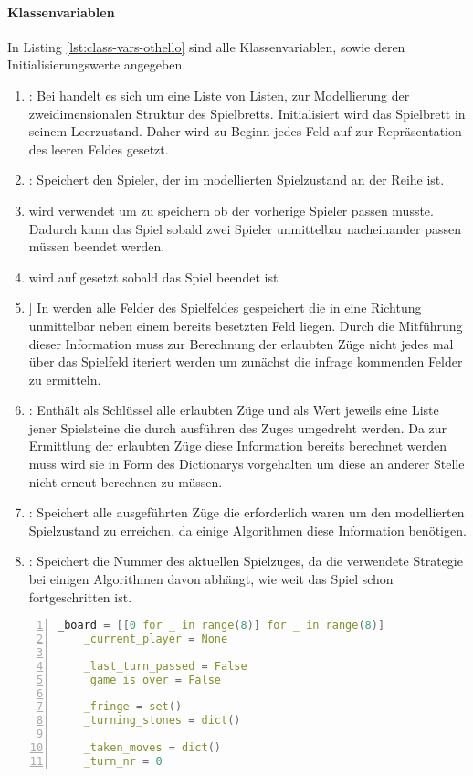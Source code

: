 \paragraph{Klassenvariablen}
In Listing \ref{lst:class-vars-othello} sind alle Klassenvariablen, sowie deren Initialisierungswerte angegeben.
\begin{enumerate}
\item {}: Bei  handelt es sich um eine Liste von Listen, zur Modellierung der zweidimensionalen Struktur des Spielbretts. Initialisiert wird das Spielbrett in seinem Leerzustand. Daher wird zu Beginn jedes Feld auf  zur Repräsentation des leeren Feldes gesetzt.
\item {}: Speichert den Spieler, der im modellierten Spielzustand an der Reihe ist.
\item {} wird verwendet um zu speichern ob der vorherige Spieler  passen musste. Dadurch kann das Spiel sobald zwei Spieler unmittelbar nacheinander passen müssen beendet werden.
\item {} wird auf  gesetzt sobald das Spiel beendet ist
\item {}] In  werden alle Felder des Spielfeldes gespeichert die in eine Richtung unmittelbar neben einem bereits besetzten Feld liegen. Durch die Mitführung dieser Information muss zur Berechnung der erlaubten Züge nicht jedes mal über das Spielfeld iteriert werden um zunächst die infrage kommenden Felder zu ermitteln.
\item {}: Enthält als Schlüssel alle erlaubten Züge und als Wert jeweils eine Liste jener Spielsteine die durch ausführen des Zuges umgedreht werden. Da zur Ermittlung der erlaubten Züge diese Information bereits berechnet werden muss wird sie in Form des Dictionarys vorgehalten um diese an anderer Stelle nicht erneut berechnen zu müssen.
\item {}: Speichert alle ausgeführten Züge die erforderlich waren um den modellierten Spielzustand zu erreichen, da einige Algorithmen diese Information benötigen.
\item {}: Speichert die Nummer des aktuellen Spielzuges, da die verwendete Strategie bei einigen Algorithmen davon abhängt, wie weit das Spiel schon fortgeschritten ist.
\end{enumerate}
\begin{lstlisting}[caption = {Klassenvariablen der Klasse \mxZitat{Othello}}, language = cpp, captionpos = t , numbers=left, label={lst:class-vars-othello}]
    _board = [[0 for _ in range(8)] for _ in range(8)]
    _current_player = None
 
    _last_turn_passed = False
    _game_is_over = False

    _fringe = set()
    _turning_stones = dict()
    
    _taken_moves = dict()
    _turn_nr = 0
\end{lstlisting}
